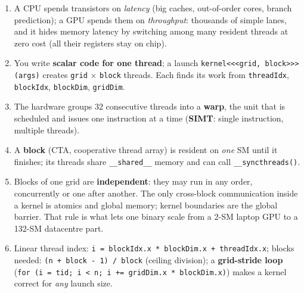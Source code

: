 \documentclass[10pt,a4paper,openany,oneside]{report}
\begin{document}
\begin{mustbox}
\begin{enumerate}[nosep]
\item A CPU spends transistors on \emph{latency} (big caches, out-of-order cores, branch prediction); a GPU spends them on \emph{throughput}: thousands of simple lanes, and it hides memory latency by switching among many resident threads at zero cost (all their registers stay on chip).
\item You write \textbf{scalar code for one thread}; a launch \texttt{kernel<<<grid, block>>>(args)} creates \texttt{grid} $\times$ \texttt{block} threads. Each finds its work from \texttt{threadIdx}, \texttt{blockIdx}, \texttt{blockDim}, \texttt{gridDim}.
\item The hardware groups 32 consecutive threads into a \textbf{warp}, the unit that is scheduled and issues one instruction at a time (\textbf{SIMT}: single instruction, multiple threads).
\item A \textbf{block} (CTA, cooperative thread array) is resident on \emph{one} SM until it finishes; its threads share \texttt{\_\_shared\_\_} memory and can call \texttt{\_\_syncthreads()}.
\item Blocks of one grid are \textbf{independent}: they may run in any order, concurrently or one after another. The only cross-block communication inside a kernel is atomics and global memory; kernel boundaries are the global barrier. That rule is what lets one binary scale from a 2-SM laptop GPU to a 132-SM datacentre part.
\item Linear thread index: \texttt{i = blockIdx.x * blockDim.x + threadIdx.x}; blocks needed: \texttt{(n + block - 1) / block} (ceiling division); a \textbf{grid-stride loop} (\texttt{for (i = tid; i < n; i += gridDim.x * blockDim.x)}) makes a kernel correct for \emph{any} launch size.
\end{enumerate}
\end{mustbox}
\end{document}
